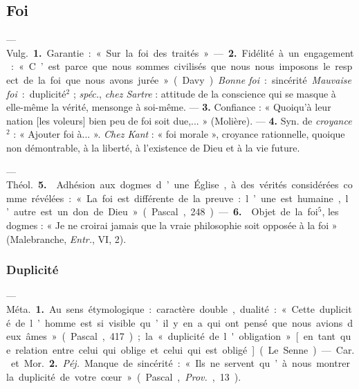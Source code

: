 \subsection{Foi}
 — \si{Vulg.} {\bf 1.} Garantie : « Sur la
foi des traités ». — {\bf 2.} Fidélité à un
engagement : « C’est parce que nous sommes civilisés que nous nous
imposons le respect de la foi que nous avons jurée » (Davy). {\it Bonne
foi} : sincérité. {\it Mauvaise foi} : duplicité$^2$ ; {\it spéc.},
{\it chez Sartre} : attitude de la conscience qui se masque à elle-même la
vérité, mensonge à soi-même. — {\bf 3.} Confiance : « Quoiqu’à leur nation
[les voleurs] bien peu de foi soit due,... » (Molière).
— {\bf 4.} Syn. de {\it croyance}$^2$ : « Ajouter foi à... ». {\it Chez
Kant} : « foi morale », croyance rationnelle, quoique non
démontrable, à la liberté, à l’existence de Dieu et à la vie future.

— \si{Théol.} {\bf 5.}  Adhésion aux
dogmes d’une Église, à des vérités considérées comme révélées : « La
foi est différente de la preuve : l’une est humaine, l’autre est un don de
Dieu » (Pascal, 248). — {\bf 6.}  Objet
de la foi$^5$, les dogmes : « Je ne croirai jamais que la vraie philosophie
soit opposée à la foi » (Malebranche, {\it Entr.}, VI, 2).
\subsubsection{Duplicité}
 — \si{Méta.} {\bf 1.} Au sens étymologique : caractère double, dualité :
« Cette duplicité de l’homme est si
visible qu’il y en a qui ont pensé
que nous avions deux âmes » (Pascal,
417); la « duplicité de l'obligation »
[en tant que relation entre celui qui
oblige et celui qui est obligé] (Le
Senne).

— \si{Car.} et \si{Mor.} {\bf 2.} {\it Péj.} Manque de
sincérité : « Ils ne servent qu’à nous
montrer la duplicité de votre cœur »
(Pascal, {\it Prov.}, 13).
